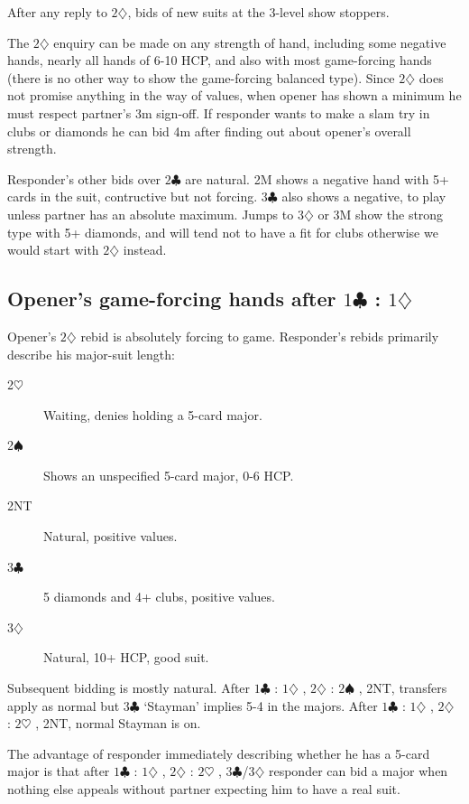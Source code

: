 \documentclass{article}
\newcommand{\sz}{\spadesuit}
\newcommand{\hz}{\heartsuit}
\newcommand{\dz}{\diamondsuit}
\newcommand{\cz}{\clubsuit}
\begin{document}
After any reply to $2\dz$, bids of new suits at the 3-level show stoppers.

The $2\dz$ enquiry can be made on any strength of hand, including some negative hands, nearly all hands of 6-10 HCP, and also with most game-forcing hands (there is no other way to show the game-forcing balanced type). Since $2\dz$ does not promise anything in the way of values, when opener has shown a minimum he must respect partner's 3m sign-off. If responder wants to make a slam try in clubs or diamonds he can bid 4m after finding out about opener's overall strength.

Responder's other bids over $2\cz$ are natural. 2M shows a negative hand with 5+ cards in the suit, contructive but not forcing. $3\cz$ also shows a negative, to play unless partner has an absolute maximum. Jumps to $3\dz$ or 3M show the strong type with 5+ diamonds, and will tend not to have a fit for clubs otherwise we would start with $2\dz$ instead.

\subsection{Opener's game-forcing hands after $1\cz$ : $1\dz$}

Opener's $2\dz$ rebid is absolutely forcing to game. Responder's rebids primarily describe his major-suit length:

\begin{description}
\item[2$\hz$] Waiting, denies holding a 5-card major.
\item[2$\sz$] Shows an unspecified 5-card major, 0-6 HCP.
\item[2NT] Natural, positive values.
\item[3$\cz$] 5 diamonds and 4+ clubs, positive values.
\item[3$\dz$] Natural, 10+ HCP, good suit.
\end{description}

Subsequent bidding is mostly natural. After $1\cz$ : $1\dz$ , $2\dz$ : $2\sz$ , 2NT, transfers apply as normal but $3\cz$ `Stayman' implies 5-4 in the majors. After $1\cz$ : $1\dz$ , $2\dz$ : $2\hz$ , 2NT, normal Stayman is on.

The advantage of responder immediately describing whether he has a 5-card major is that after $1\cz$ : $1\dz$ , $2\dz$ : $2\hz$ , $3\cz$/$3\dz$ responder can bid a major when nothing else appeals without partner expecting him to have a real suit.
\end{document}
